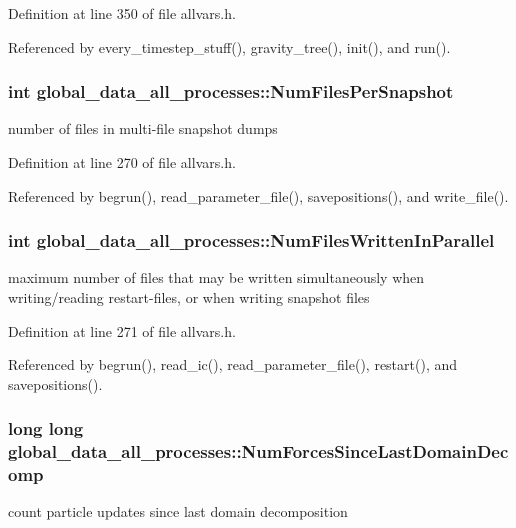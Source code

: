 Definition at line 350 of file allvars.h.



Referenced by every\_\-timestep\_\-stuff(), gravity\_\-tree(), init(), and run().

\hypertarget{structglobal__data__all__processes_a3749135400fbf51c319054233d7a64a7}{
\subsubsection[{NumFilesPerSnapshot}]{\setlength{\rightskip}{0pt plus 5cm}int {\bf global\_\-data\_\-all\_\-processes::NumFilesPerSnapshot}}}
\label{structglobal__data__all__processes_a3749135400fbf51c319054233d7a64a7}
number of files in multi-\/file snapshot dumps 

Definition at line 270 of file allvars.h.



Referenced by begrun(), read\_\-parameter\_\-file(), savepositions(), and write\_\-file().

\hypertarget{structglobal__data__all__processes_a0e328240a1fb59c7bf55332a1a691029}{
\subsubsection[{NumFilesWrittenInParallel}]{\setlength{\rightskip}{0pt plus 5cm}int {\bf global\_\-data\_\-all\_\-processes::NumFilesWrittenInParallel}}}
\label{structglobal__data__all__processes_a0e328240a1fb59c7bf55332a1a691029}
maximum number of files that may be written simultaneously when writing/reading restart-\/files, or when writing snapshot files 

Definition at line 271 of file allvars.h.



Referenced by begrun(), read\_\-ic(), read\_\-parameter\_\-file(), restart(), and savepositions().

\hypertarget{structglobal__data__all__processes_a64e0b5f35f25dd09297bc41acf0502f7}{
\subsubsection[{NumForcesSinceLastDomainDecomp}]{\setlength{\rightskip}{0pt plus 5cm}long long {\bf global\_\-data\_\-all\_\-processes::NumForcesSinceLastDomainDecomp}}}
\label{structglobal__data__all__processes_a64e0b5f35f25dd09297bc41acf0502f7}
count particle updates since last domain decomposition 

